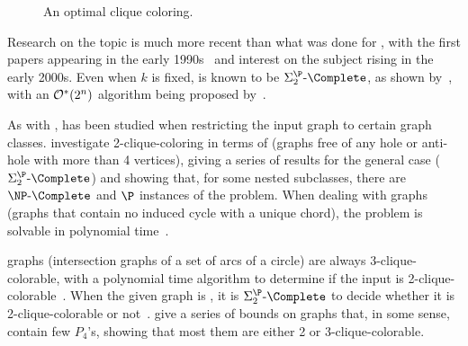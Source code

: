 

\begin{figure}[!htb]
    \centering
    \caption{An optimal clique coloring.}
    \label{fig:clique_color}
\end{figure}

Research on the topic is much more recent than what was done for , with the first papers appearing in the early 1990s~\citep{first_clique_color} and interest on the subject rising in the early 2000s.
Even when $k$ is fixed,  is known to be $\SiP{2}\text{-}\Complete$, as shown by~\cite{clique_coloring_complexity}, with an $\mathcal{O}^*\!\left(2^n\right)$ algorithm being proposed by~\cite{clique_color_algorithm}.

As with ,  has been studied when restricting the input graph to certain graph classes.
\cite{weakly_clique_color} investigate 2-clique-coloring in terms of  (graphs free of any hole or anti-hole with more than 4 vertices), giving a series of results for the general case ($\SiP{2}\text{-}\Complete$) and showing that, for some nested subclasses, there are $\NPc$ and $\P$ instances of the problem.
When dealing with  graphs (graphs that contain no induced cycle with a unique chord), the problem is solvable in polynomial time~\citep{unichord_coloring}.

 graphs (intersection graphs of a set of arcs of a circle) are always 3-clique-colorable, with a polynomial time algorithm to determine if the input is 2-clique-colorable~\citep{clique_circular_arc}.
When the given graph is , it is $\SiP{2}\text{-}\Complete$ to decide whether it is 2-clique-colorable or not~\citep{clique_oddhole}.
\cite{clique_coloring_few_p4} give a series of bounds on graphs that, in some sense, contain few $P_4$'s, showing that most them are either 2 or 3-clique-colorable.

